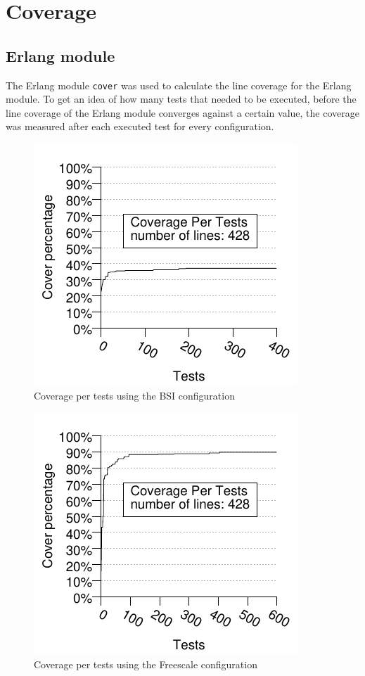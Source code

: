 \section{Coverage}
\subsection{Erlang module}
\newcommand{\linecoverage}{97.38\%}
\newcommand{\bullseyecoverage}{81\%}
The Erlang module \lstinline!cover! was used to calculate the line
coverage for the Erlang module. To get an idea of how many tests that
needed to be executed, before the line coverage of the Erlang module
converges against a certain value, the coverage was measured after
each executed test for every configuration.

\begin{figure}[!ht]
\begin{center}
\includegraphics{generated_pictures/coverage_per_tests_bsi.pdf}
\end{center}
\caption{Coverage per tests using the BSI configuration}
\label{FIG:COV_PER_TESTS_BSI}
\end{figure}

\begin{figure}[!ht]
\begin{center}
\includegraphics{generated_pictures/coverage_per_tests_freescale.pdf}
\end{center}
\caption{Coverage per tests using the Freescale configuration}
\label{FIG:COV_PER_TESTS_FREESCALE}
\end{figure}


